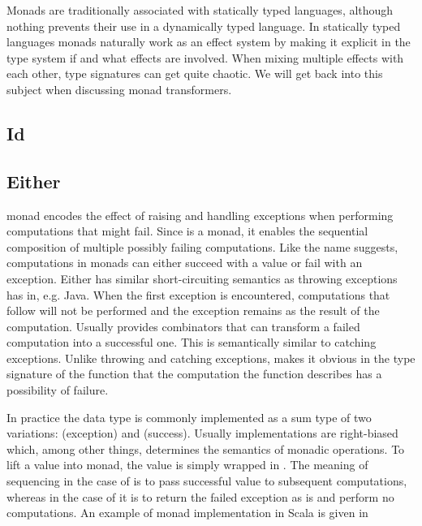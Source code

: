 Monads are traditionally associated with statically typed languages, although nothing prevents their use in a dynamically typed language. In statically typed languages monads naturally work as an effect system by making it explicit in the type system if and what effects are involved. When mixing multiple effects with each other, type signatures can get quite chaotic. We will get back into this subject when discussing monad transformers.


\subsection{Id}



\subsection{Either} \label{background:monads:either}
 monad encodes the effect of raising and handling exceptions when performing computations that might fail. Since  is a monad, it enables the sequential composition of multiple possibly failing computations. Like the name suggests, computations in  monads can either succeed with a value or fail with an exception. Either has similar short-circuiting semantics as throwing exceptions has in, e.g. Java. When the first exception is encountered, computations that follow will not be performed and the exception remains as the result of the computation. Usually  provides combinators that can transform a failed computation into a successful one. This is semantically similar to catching exceptions. Unlike throwing and catching exceptions,  makes it obvious in the type signature of the function that the computation the function describes has a possibility of failure.

In practice the  data type is commonly implemented as a sum type of two variations:  (exception) and  (success). Usually implementations are right-biased which, among other things, determines the semantics of monadic operations. To lift a value into  monad, the value is simply wrapped in . The meaning of sequencing in the case of  is to pass successful value to subsequent computations, whereas in the case of  it is to return the failed exception as is and perform no computations. An example of  monad implementation in Scala is given in 

